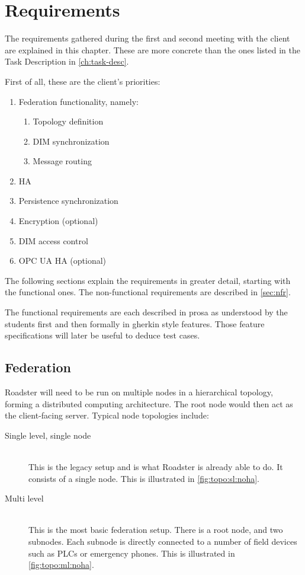 \chapter{Requirements}
The requirements gathered during the first and second meeting with the client are
explained in this chapter. These are more concrete than the ones listed in the
Task Description in \autoref{ch:task-desc}.

First of all, these are the client's priorities:

\begin{enumerate}
\item Federation functionality, namely:
	\begin{enumerate}
		\item Topology definition
		\item DIM synchronization
		\item Message routing
	\end{enumerate}
\item \Gls{HA}
\item Persistence synchronization
\item Encryption (optional)
\item DIM access control
\item OPC UA \gls{HA} (optional)
\end{enumerate}

The following sections explain the requirements in greater detail, starting
with the functional ones. The non-functional requirements are described in
\autoref{sec:nfr}.

The functional requirements are each described in prosa as understood by the
students first and then formally in \gls{gherkin} style features. Those feature
specifications will later be useful to deduce test cases.

\section{Federation}
Roadster will need to be run on multiple nodes in a hierarchical topology,
forming a distributed computing architecture. The root node would then act as
the client-facing server. Typical node topologies include:

\begin{description}
	\item [ Single level, single node ] \hfill\\
		This is the legacy setup and is what Roadster is already able
		to do. It consists of a single node. This is illustrated in
		\autoref{fig:topo:sl:noha}.

	\item [ Multi level ] \hfill\\
		This is the most basic federation setup. There is a root node, and
		two subnodes. Each subnode is directly connected to a number of field devices such as
		\glspl{PLC} or emergency phones. This is illustrated in
		\autoref{fig:topo:ml:noha}.
\end{description}

